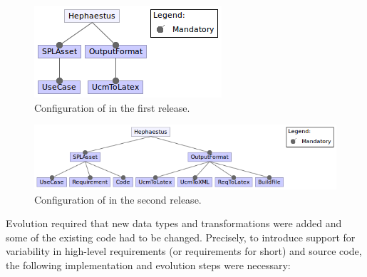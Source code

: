 
\begin{figure}[t!]
\begin{center}
\includegraphics[scale=0.6]{imagens/conf1a-hp.png}
\caption{Configuration of \hp{} in the first release.}
\label{fig:hephaestus-conf1a}
\end{center}
\end{figure}


\begin{figure}[t!]
\begin{center}
\includegraphics[scale=0.6]{imagens/conf1b-hp.png}
\caption{Configuration of \hp{} in the second release.}
\label{fig:hephaestus-conf1b}
\end{center}
\end{figure}


Evolution required that new data types and transformations were added
and some of the existing code had to be changed. Precisely, to
introduce support for variability in high-level requirements (or
requirements for short) and source code, the following implementation
and evolution steps were necessary:

